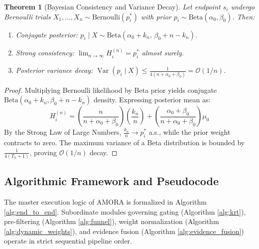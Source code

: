 \documentclass[conference,onecolumn,10pt]{IEEEtran}
\newtheorem{theorem}{Theorem}
\begin{document}
\begin{theorem}[Bayesian Consistency and Variance Decay]
\label{thm:bayesian}
Let endpoint $s_i$ undergo Bernoulli trials $X_1, \dots, X_n \sim \text{Bernoulli}(p_i^*)$ with prior $p_i \sim \text{Beta}(\alpha_0, \beta_0)$. Then:
\begin{enumerate}
    \item Conjugate posterior: $p_i \mid X \sim \text{Beta}(\alpha_0 + k_n, \, \beta_0 + n - k_n)$.
    \item Strong consistency: $\lim_{n \to \infty} H_i^{(n)} = p_i^*$ almost surely.
    \item Posterior variance decay: $\operatorname{Var}(p_i \mid X) \le \frac{1}{4(n + \alpha_0 + \beta_0)} = \mathcal{O}(1/n)$.
\end{enumerate}
\end{theorem}

\begin{proof}
Multiplying Bernoulli likelihood by Beta prior yields conjugate $\text{Beta}(\alpha_0 + k_n, \beta_0 + n - k_n)$ density. Expressing posterior mean as:
\begin{equation}
    H_i^{(n)} = \left(\frac{n}{n + \alpha_0 + \beta_0}\right)\left(\frac{k_n}{n}\right) + \left(\frac{\alpha_0 + \beta_0}{n + \alpha_0 + \beta_0}\right)\mu_0
\end{equation}
By the Strong Law of Large Numbers, $\frac{k_n}{n} \to p_i^*$ a.s., while the prior weight contracts to zero. The maximum variance of a Beta distribution is bounded by $\frac{1}{4(T_n + 1)}$, proving $\mathcal{O}(1/n)$ decay.
\end{proof}

\subsection{Algorithmic Framework and Pseudocode}
\label{subsec:algorithms}

The master execution logic of AMORA is formalized in Algorithm \ref{alg:end_to_end}. Subordinate modules governing gating (Algorithm \ref{alg:krt}), pre-filtering (Algorithm \ref{alg:funnel}), weight normalization (Algorithm \ref{alg:dynamic_weights}), and evidence fusion (Algorithm \ref{alg:evidence_fusion}) operate in strict sequential pipeline order.
\end{document}
